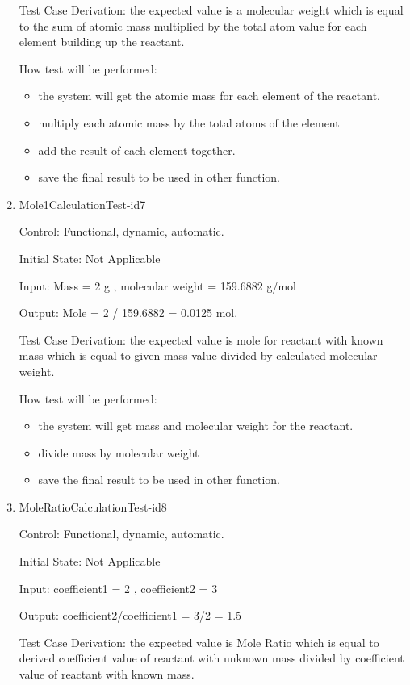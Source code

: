 \documentclass[12pt, titlepage]{article}
\begin{document}
\begin{enumerate}
Test Case Derivation: the expected value is a molecular weight which is equal to the sum of  atomic mass multiplied by the total atom value for each element building up the reactant. 
					
How test will be performed: 
\begin{itemize}
\item the system will get the atomic mass for each element of the reactant.
\item multiply each atomic mass by the total atoms of the element 
\item add the result of each element together.
\item save the final result to be used in other function.
\end{itemize}

\item{Mole1CalculationTest-id7\\}

Control: Functional, dynamic, automatic.
					
Initial State: Not Applicable
					
Input: Mass = 2 g , molecular weight = 159.6882 g/mol
			
Output:  Mole = 2 / 159.6882 =  0.0125 mol. 

Test Case Derivation: the expected value is mole for reactant with known mass which is equal to given mass value divided by calculated molecular weight. 	
				
How test will be performed: 
\begin{itemize}
\item the system will get mass and molecular weight  for the reactant.
\item divide mass by molecular weight 
\item save the final result to be used in other function.
\end{itemize}

\item{MoleRatioCalculationTest-id8\\}

Control: Functional, dynamic, automatic.
					
Initial State: Not Applicable
					
Input: coefficient1 = 2  , coefficient2 = 3
			
Output:  coefficient2/coefficient1 = 3/2 = 1.5 

Test Case Derivation: the expected value is Mole Ratio which is equal to derived coefficient value of reactant with unknown mass divided by coefficient value of reactant with known mass.
 					

\end{enumerate}
\end{document}
